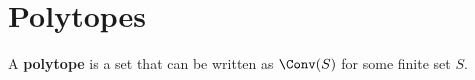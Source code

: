 





\section{Polytopes}



\begin{definition}[Polytope]
    \label{polytope}
  
    A {\bf polytope} is a set that can be written as $\Conv(S)$ for some finite set $S$.
  \end{definition}
